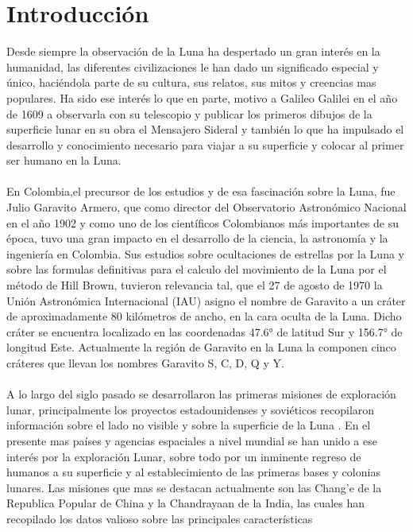 \documentclass[12pt]{article}
\begin{document}
\section{Introducción}\label{sec:introduccion}
Desde siempre la observación de la Luna ha despertado un gran interés en la humanidad, 
las diferentes civilizaciones le han dado un significado especial y único, haciéndola parte 
de su cultura, sus relatos, sus mitos y creencias mas populares. Ha sido ese interés lo que 
en parte,  motivo a Galileo Galilei en el año de 1609 a observarla con su telescopio y 
publicar los primeros dibujos de la superficie lunar en su obra el Mensajero 
Sideral \parencite{galilei1610} y también lo que ha impulsado el desarrollo y 
conocimiento necesario para viajar a su superficie y colocar al primer ser humano en la Luna.\\
\\
En Colombia,el precursor de los estudios y de esa fascinación sobre la Luna, fue 
Julio Garavito Armero, que como director del Observatorio Astronómico Nacional en el año 1902 y 
como uno de los científicos Colombianos más importantes de su época, tuvo una gran 
impacto en el desarrollo de la ciencia, la astronomía y la ingeniería en Colombia. 
Sus estudios sobre ocultaciones de estrellas por la Luna y sobre las formulas definitivas 
para el calculo del movimiento de la Luna por el método de Hill Brown\parencite{GaravitoArmero_2017}, 
tuvieron relevancia tal, que el 27 de agosto de 1970 la Unión Astronómica Internacional (IAU) 
asigno el nombre de Garavito a un 
cráter de aproximadamente 80 kilómetros de ancho, en la cara oculta de la Luna. 
Dicho cráter se encuentra localizado en las coordenadas 47.6° de latitud Sur y 156.7° 
de longitud Este. Actualmente la región de Garavito en la Luna la componen cinco 
cráteres que llevan los nombres Garavito S, C, D, Q y Y.\\
\\
A lo largo del siglo pasado se desarrollaron las primeras misiones de exploración lunar, principalmente
los proyectos estadounidenses y soviéticos recopilaron información sobre el lado no visible  y sobre la 
superficie de la Luna \parencite{graf1993lunar}. En el presente mas países y agencias 
espaciales a nivel mundial se han unido a ese interés por la exploración Lunar, sobre todo por un 
inminente regreso de humanos a su superficie y al establecimiento de las primeras bases y colonias lunares. 
Las misiones que mas se destacan actualmente son las Chang'e de la Republica Popular de China y la 
Chandrayaan de la India, las cuales han recopilado los datos valioso sobre las principales características 
\end{document}
